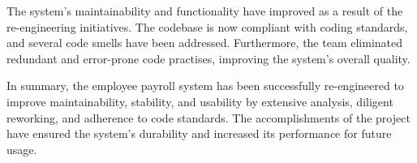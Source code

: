 \documentclass[12pt,english]{article}
\begin{document}
\vspace{0.5cm}

The system's maintainability and functionality have improved as a result of the re-engineering initiatives. The codebase is now compliant with coding standards, and several code smells have been addressed. Furthermore, the team eliminated redundant and error-prone code practises, improving the system's overall quality.

\vspace{0.5cm}

In summary, the employee payroll system has been successfully re-engineered to improve maintainability, stability, and usability by extensive analysis, diligent reworking, and adherence to code standards. The accomplishments of the project have ensured the system's durability and increased its performance for future usage.

\newpage
\end{document}
